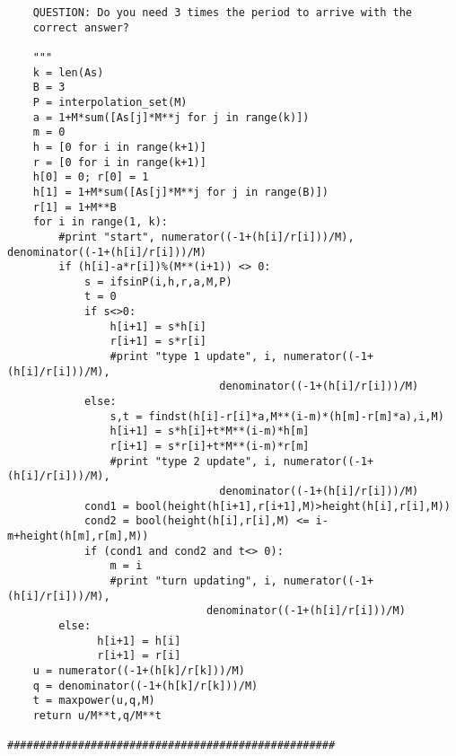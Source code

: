 \begin{verbatim}
    QUESTION: Do you need 3 times the period to arrive with the
    correct answer?

    """
    k = len(As)
    B = 3
    P = interpolation_set(M)
    a = 1+M*sum([As[j]*M**j for j in range(k)])
    m = 0
    h = [0 for i in range(k+1)]
    r = [0 for i in range(k+1)]
    h[0] = 0; r[0] = 1
    h[1] = 1+M*sum([As[j]*M**j for j in range(B)])
    r[1] = 1+M**B
    for i in range(1, k):
        #print "start", numerator((-1+(h[i]/r[i]))/M), denominator((-1+(h[i]/r[i]))/M)
        if (h[i]-a*r[i])%(M**(i+1)) <> 0:
            s = ifsinP(i,h,r,a,M,P)
            t = 0
            if s<>0:
                h[i+1] = s*h[i]
                r[i+1] = s*r[i]
                #print "type 1 update", i, numerator((-1+(h[i]/r[i]))/M),
								 denominator((-1+(h[i]/r[i]))/M)
            else:
                s,t = findst(h[i]-r[i]*a,M**(i-m)*(h[m]-r[m]*a),i,M)
                h[i+1] = s*h[i]+t*M**(i-m)*h[m]
                r[i+1] = s*r[i]+t*M**(i-m)*r[m]
                #print "type 2 update", i, numerator((-1+(h[i]/r[i]))/M),
							 	 denominator((-1+(h[i]/r[i]))/M)
            cond1 = bool(height(h[i+1],r[i+1],M)>height(h[i],r[i],M))
            cond2 = bool(height(h[i],r[i],M) <= i-m+height(h[m],r[m],M))
            if (cond1 and cond2 and t<> 0):
                m = i
                #print "turn updating", i, numerator((-1+(h[i]/r[i]))/M),
							   denominator((-1+(h[i]/r[i]))/M)
        else:
              h[i+1] = h[i]
              r[i+1] = r[i]
    u = numerator((-1+(h[k]/r[k]))/M)
    q = denominator((-1+(h[k]/r[k]))/M)
    t = maxpower(u,q,M)
    return u/M**t,q/M**t

###################################################
\end{verbatim}
